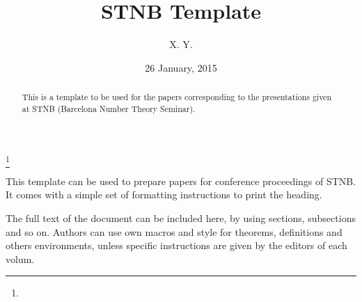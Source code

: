 \documentclass{stnb-proceedings}
\theoremstyle{definition}
\theoremstyle{remark}
\numberwithin{equation}{section}
\begin{document}
\title{STNB Template}


\author{X. Y.}
\address{}
\curraddr{}
\email{}
\thanks{}



\keywords{}

\date{26 January, 2015}  %

\begin{abstract}
This is a template to be used for the papers corresponding to the presentations given at STNB (Barcelona Number Theory Seminar).
\end{abstract}

\maketitle

This template can be used to prepare papers for conference proceedings of STNB.
It comes with a simple set of formatting instructions to print the heading.


The full text of the document can be included here, by using sections, subsections and so on. Authors can use own macros and style for theorems, definitions and others environments, unless specific instructions are given by the editors of each volum.
\end{document}
